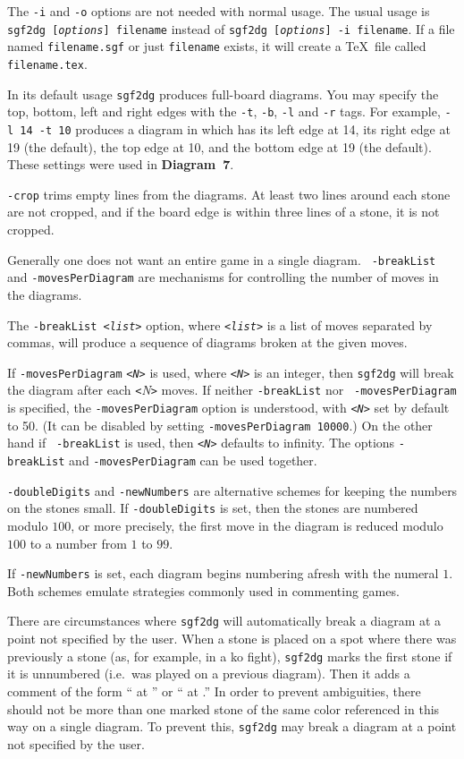 The {\tt -i} and {\tt -o} options are not needed with normal usage.
The usual usage is {\tt sgf2dg {\rm [{\it options}]} filename} instead of
{\tt sgf2dg {\rm [{\it options}]} -i filename}. If
a file named {\tt filename.sgf} or just {\tt filename} exists, it
will create a \TeX\ file called {\tt filename.tex}. 

In its default usage {\tt sgf2dg} produces full-board diagrams.
You may specify the top, bottom, left and right edges with the
{\tt -t}, {\tt -b}, {\tt -l} and {\tt -r} tags. For example,
{\tt \hbox{-l 14} \hbox{-t 10}} produces a diagram in which
has its left edge at 14, its right edge at 19 (the default),
the top edge at 10, and the bottom edge at 19 (the default).
These settings were used in {\bf Diagram~7}.

{\tt -crop} trims empty lines from the diagrams.  At least two lines around
each stone are not cropped, and if the board edge is within three lines of
a stone, it is not cropped.

Generally one does not want an entire game in a single diagram. {\tt
-breakList} and {\tt -movesPerDiagram} are mechanisms for controlling the
number of moves in the diagrams.

The {\tt -breakList <{\it list\/}>} option, where {\tt<{\it list\/}>} is a list of
moves separated by commas, will produce a sequence of diagrams broken at the
given moves.

If {\tt -movesPerDiagram} {\tt<{\it N\/}>} is used, where {\tt<{\it N\/}>}
is an integer, then {\tt sgf2dg} will break the diagram after each
{\tt<}{\it N\/}{\tt>} moves. If neither {\tt -breakList} nor {\tt
-movesPerDiagram} is specified, the {\tt -movesPerDiagram} option is
understood, with {\tt<{\it N\/}>} set by default to 50. (It can be disabled
by setting {\tt -movesPerDiagram 10000}.) On the other hand if {\tt
-breakList} is used, then {\tt<{\it N\/}>} defaults to infinity. The
options {\tt -breakList} and {\tt -movesPerDiagram} can be used together.

{\tt -doubleDigits} and {\tt -newNumbers} are alternative schemes for
keeping the numbers on the stones small. If {\tt -doubleDigits} is set,
then the stones are numbered modulo $100$, or more precisely, the first
move in the diagram is reduced modulo $100$ to a number from $1$ to
$99$.

If {\tt -newNumbers} is set, each diagram begins numbering afresh with the
numeral $1$. Both schemes emulate strategies commonly used in commenting
games.

There are circumstances where {\tt sgf2dg} will automatically break
a diagram at a point not specified by the user. When a stone is placed
on a spot where there was previously a stone (as, for example, in a
ko fight), {\tt sgf2dg} marks the first stone if it is unnumbered
(i.e.\ was played on a previous diagram). Then it adds a comment
of the form `` at '' or
`` at \textstone{\goo\- ;;}.'' 
In order to prevent ambiguities, there should not be more than one marked
stone of the same color referenced in this way on a single diagram. To prevent
this, {\tt sgf2dg} may break a diagram at a point not specified by the user.

